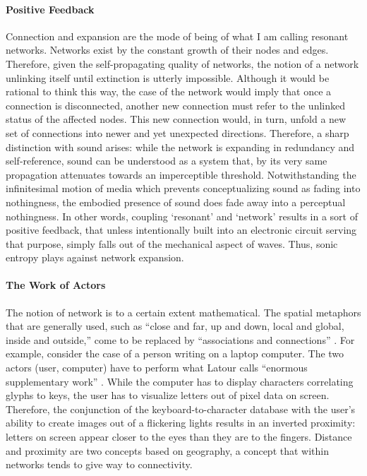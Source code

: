 \paragraph{Positive Feedback}
Connection and expansion are the mode of being of what I am calling resonant networks. Networks exist by the constant growth of their nodes and edges. Therefore, given the self-propagating quality of networks, the notion of a network unlinking itself until extinction is utterly impossible. Although it would be rational to think this way, the case of the network would imply that once a connection is disconnected, another new connection must refer to the unlinked status of the affected nodes. This new connection would, in turn, unfold a new set of connections into newer and yet unexpected directions. Therefore, a sharp distinction with sound arises: while the network is expanding in redundancy and self-reference, sound can be understood as a system that, by its very same propagation attenuates towards an imperceptible threshold. Notwithstanding the infinitesimal motion of media which prevents conceptualizing sound as fading into nothingness, the embodied presence of sound does fade away into a perceptual nothingness. In other words, coupling `resonant' and `network' results in a sort of positive feedback, that unless intentionally built into an electronic circuit serving that purpose, simply falls out of the mechanical aspect of waves. Thus, sonic entropy plays against network expansion.

\paragraph{The Work of Actors}
The notion of network is to a certain extent mathematical. The spatial metaphors that are generally used, such as ``close and far, up and down, local and global, inside and outside,'' come to be replaced by ``associations and connections'' \parencite[6]{Lat90:On}. For example, consider the case of a person writing on a laptop computer. The two actors (user, computer) have to perform what Latour calls ``enormous supplementary work'' \parencite[6]{Lat90:On}. While the computer has to display characters correlating glyphs to keys, the user has to visualize letters out of pixel data on screen. Therefore, the conjunction of the keyboard-to-character database with the user's ability to create images out of a flickering lights results in an inverted proximity: letters on screen appear closer to the eyes than they are to the fingers. Distance and proximity are two concepts based on geography, a concept that within networks tends to give way to connectivity.



